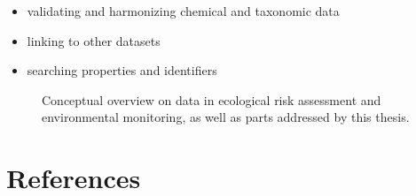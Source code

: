 \begin{itemize}
	\item validating and harmonizing chemical and taxonomic data
	\item linking to other datasets
	\item searching properties and identifiers
\end{itemize}




\begin{figure}[h]
	\centering
	\resizebox{\textwidth}{!}{%
		
	}
	\caption[Conceptual overview of the topics addressed by this thesis]{Conceptual overview on data in ecological risk assessment and environmental monitoring, as well as parts addressed by this thesis.}
	\label{fig:intro:overview}
\end{figure}




\newpage
\section{References}
\printbibliography[heading=none]
